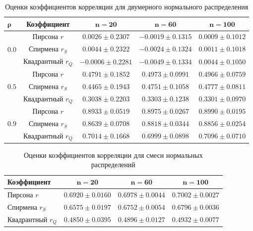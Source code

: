 \documentclass[a4paper, 14pt]{extarticle}
\begin{document}
\begin{table}[H]
    \centering
    \caption{Оценки коэффициентов корреляции для двумерного нормального распределения}
    \label{tab:corr_normal}
    \begin{tabular}{|l|c|c|c|c|}
        \hline
        $\mathbf{\rho}$ & \textbf{Коэффициент} & $\mathbf{n=20}$ & $\mathbf{n=60}$ & $\mathbf{n=100}$ \\ \hline
        \multirow{3}{*}{$0.0$} 
        & Пирсона $r$   & $0.0026 \pm 0.2307$ & $-0.0019 \pm 0.1315$ & $0.0009 \pm 0.1012$ \\ \cline{2-5}
        & Спирмена $r_S$ & $0.0044 \pm 0.2322$ & $-0.0024 \pm 0.1324$ & $0.0011 \pm 0.1018$ \\ \cline{2-5}
        & Квадрантный $r_Q$ & $-0.0006 \pm 0.2281$ & $-0.0049 \pm 0.1334$ & $0.0044 \pm 0.1050$ \\ \hline
        \multirow{3}{*}{$0.5$} 
        & Пирсона $r$   & $0.4791 \pm 0.1852$ & $0.4973 \pm 0.0991$ & $0.4966 \pm 0.0759$ \\ \cline{2-5}
        & Спирмена $r_S$ & $0.4465 \pm 0.1943$ & $0.4751 \pm 0.1058$ & $0.4777 \pm 0.0811$ \\ \cline{2-5}
        & Квадрантный $r_Q$ & $0.3038 \pm 0.2203$ & $0.3303 \pm 0.1238$ & $0.3301 \pm 0.0970$ \\ \hline
        \multirow{3}{*}{$0.9$} 
        & Пирсона $r$   & $0.8933 \pm 0.0519$ & $0.8975 \pm 0.0267$ & $0.8990 \pm 0.0195$ \\ \cline{2-5}
        & Спирмена $r_S$ & $0.8639 \pm 0.0708$ & $0.8818 \pm 0.0344$ & $0.8856 \pm 0.0254$ \\ \cline{2-5}
        & Квадрантный $r_Q$ & $0.7014 \pm 0.1668$ & $0.6999 \pm 0.0898$ & $0.7096 \pm 0.0710$ \\ \hline
    \end{tabular}
\end{table}

\begin{table}[H]
    \centering
    \caption{Оценки коэффициентов корреляции для смеси нормальных распределений}
    \label{tab:corr_mixture}
    \begin{tabular}{|l|c|c|c|}
        \hline
        \textbf{Коэффициент} & $\mathbf{n=20}$ & $\mathbf{n=60}$ & $\mathbf{n=100}$ \\ \hline
        Пирсона $r$   & $0.6920 \pm 0.0160$ & $0.6978 \pm 0.0044$ & $0.7002 \pm 0.0027$ \\ \hline
        Спирмена $r_S$ & $0.6575 \pm 0.0197$ & $0.6752 \pm 0.0054$ & $0.6796 \pm 0.0036$ \\ \hline
        Квадрантный $r_Q$ & $0.4850 \pm 0.0395$ & $0.4896 \pm 0.0127$ & $0.4932 \pm 0.0077$ \\ \hline
    \end{tabular}
\end{table}
\end{document}
